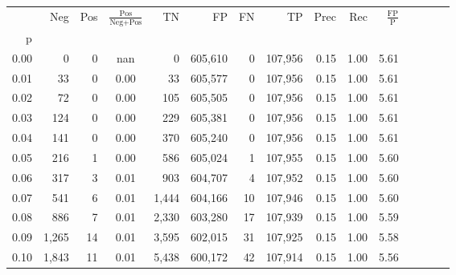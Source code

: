 \begin{tabular}{rrrcrrrrrrrrrrr}
\toprule
{} &     Neg &    Pos & $\frac{\text{Pos}}{\text{Neg}+\text{Pos}}$ &       TN &       FP &       FN &       TP &  Prec &   Rec & $\frac{\text{FP}}{\text{P}}$ \\
p    &         &        &                                            &          &          &          &          &       &       &                              \\
\midrule
0.00 &       0 &      0 &                                        nan &        0 &  605,610 &        0 &  107,956 &  0.15 &  1.00 &                         5.61 \\
0.01 &      33 &      0 &                                       0.00 &       33 &  605,577 &        0 &  107,956 &  0.15 &  1.00 &                         5.61 \\
0.02 &      72 &      0 &                                       0.00 &      105 &  605,505 &        0 &  107,956 &  0.15 &  1.00 &                         5.61 \\
0.03 &     124 &      0 &                                       0.00 &      229 &  605,381 &        0 &  107,956 &  0.15 &  1.00 &                         5.61 \\
0.04 &     141 &      0 &                                       0.00 &      370 &  605,240 &        0 &  107,956 &  0.15 &  1.00 &                         5.61 \\
0.05 &     216 &      1 &                                       0.00 &      586 &  605,024 &        1 &  107,955 &  0.15 &  1.00 &                         5.60 \\
0.06 &     317 &      3 &                                       0.01 &      903 &  604,707 &        4 &  107,952 &  0.15 &  1.00 &                         5.60 \\
0.07 &     541 &      6 &                                       0.01 &    1,444 &  604,166 &       10 &  107,946 &  0.15 &  1.00 &                         5.60 \\
0.08 &     886 &      7 &                                       0.01 &    2,330 &  603,280 &       17 &  107,939 &  0.15 &  1.00 &                         5.59 \\
0.09 &   1,265 &     14 &                                       0.01 &    3,595 &  602,015 &       31 &  107,925 &  0.15 &  1.00 &                         5.58 \\
0.10 &   1,843 &     11 &                                       0.01 &    5,438 &  600,172 &       42 &  107,914 &  0.15 &  1.00 &                         5.56 \\

\end{tabular}
